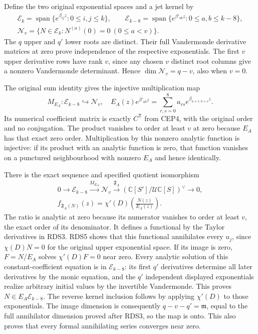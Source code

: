 \documentclass[11pt,a4paper]{article}
\begin{document}
Define the two original exponential spaces and a jet kernel by
\[
 \begin{gathered}
 \mathscr E_k=\operatorname{span}\{e^{\beta_{ij}z}:0\le i,j\le k\},
 \qquad
 \mathscr E_{k-8}=\operatorname{span}\{e^{\beta'_{ab}z}:0\le a,b\le k-8\},\\
 \mathscr N_v=\{N\in\mathscr E_k:N^{(a)}(0)=0\ (0\le a<v)\}.
 \end{gathered}\tag{RDS6}
\]
The $q$ upper and $q'$ lower roots are distinct. Their full
Vandermonde derivative matrices at zero prove independence of
the respective exponentials. The first $v$ upper derivative
rows have rank $v$, since any chosen $v$ distinct root columns
give a nonzero Vandermonde determinant. Hence
$\dim\mathscr N_v=q-v$, also when $v=0$.

The original sum identity gives the injective multiplication map
\[
 M_{E_A}:\mathscr E_{k-8}\hookrightarrow\mathscr N_v,
 \quad
 E_A(z)e^{\beta'_{ab}z}
       =\sum_{r,s=0}^8a_{rs}e^{\beta_{a+r,b+s}z}.
 \tag{RDS7}
\]
Its numerical coefficient matrix is exactly $C^{\mathsf T}$
from CEP4, with the original order and no conjugation.
The product vanishes to order at least $v$ at zero because
$E_A$ has that exact zero order. Multiplication by this
nonzero analytic function is injective: if its product with
an analytic function is zero, that function vanishes on a
punctured neighbourhood with nonzero $E_A$ and hence identically.

There is the exact sequence and specified quotient isomorphism
\[
 \begin{gathered}
 0\longrightarrow\mathscr E_{k-8}
    \xrightarrow{M_{E_A}}\mathscr N_v
    \xrightarrow{\mathfrak F_A}
                 (\mathbb C[S']/\mathcal U\mathbb C[S])^\vee
    \longrightarrow0,\\
 f_{\mathfrak F_A(N)}(z)=\chi'(D)\left(\frac{N(z)}{E_A(z)}\right).
 \end{gathered}\tag{RDS8}
\]
The ratio is analytic at zero because its numerator vanishes
to order at least $v$, the exact order of its denominator.
It defines a functional by the Taylor derivatives in RDS3.
RDS5 shows that this functional annihilates every $u_j$,
since $\chi(D)N=0$ for the original upper exponential space.
If its image is zero, $F=N/E_A$ solves $\chi'(D)F=0$ near
zero. Every analytic solution of this constant-coefficient
equation is in $\mathscr E_{k-8}$: its first $q'$ derivatives
determine all later derivatives by the monic equation, and
the $q'$ independent displayed exponentials realize arbitrary
initial values by the invertible Vandermonde. This proves
$N\in E_A\mathscr E_{k-8}$. The reverse kernel inclusion
follows by applying $\chi'(D)$ to those exponentials.
The image dimension is consequently
$q-v-q'=\mathfrak m$, equal to the full annihilator dimension
proved after RDS3, so the map is onto. This also proves that
every formal annihilating series converges near zero.
\end{document}
